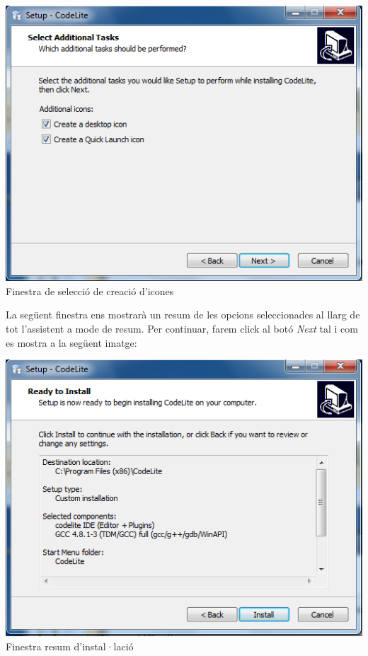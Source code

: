 \documentclass[11pt]{article}
\begin{document}
\begin{center}
\includegraphics[scale=0.5]{img/Installer_8.png}\\
\small{Finestra de selecció de creació d'icones}
\end{center}

\noindent La següent finestra ens mostrarà un resum de les opcions seleccionades al llarg de tot l'assistent a mode de resum. Per continuar, farem click al botó \textit{Next} tal i com es mostra a la següent imatge:

\begin{center}
\includegraphics[scale=0.5]{img/Installer_9.png}\\
\small{Finestra resum d'instal·lació}
\end{center}
\end{document}

